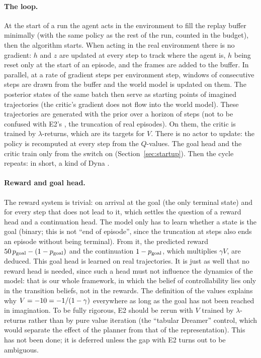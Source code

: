 \documentclass[10pt]{article}
\begin{document}
\paragraph{The loop.}
At the start of a run the agent acts in the environment to fill the replay buffer minimally (with the same policy as the
rest of the run, counted in the budget), then the algorithm starts.
When acting in the real environment there is no gradient: $h$ and $z$ are updated at every step to track where the
agent is, $h$ being reset only at the start of an episode, and the frames are added to the buffer.
In parallel, at a rate of \eThreeReplayRatio{} gradient steps per environment step, \eThreeBatchWindows{} windows of
\eThreeWindowLength{} consecutive steps are drawn from the buffer and the world model is updated on them.
The posterior states of the same batch then serve as starting points of imagined trajectories (the critic's gradient
does not flow into the world model).
These trajectories are generated with the prior over a horizon of \eThreeImagHorizon{} steps (not to be confused with
E2's \eThreeEpisodeHorizon, the truncation of real episodes).
On them, the critic is trained by $\lambda$-returns, which are its targets for $V$.
There is no actor to update: the policy is recomputed at every step from the $Q$-values.
The goal head and the critic train only from the switch on (Section~\ref{sec:startup}).
Then the cycle repeats: in short, a kind of Dyna .

\paragraph{Reward and goal head.}
The reward system is trivial: \eThreeGoalReward{} on arrival at the goal (the only terminal state) and
\eThreeStepReward{} for every step that does not lead to it, which settles the question of a reward head and a
continuation head.
The model only has to learn whether a state is the goal (binary; this is not ``end of episode'', since the truncation at
\eThreeEpisodeHorizon{} steps also ends an episode without being terminal).
From it, the predicted reward $50\,p_{\mathrm{goal}} - (1 - p_{\mathrm{goal}})$ and the continuation $1 - p_{\mathrm{goal}}$, which multiplies %
$\gamma V$, are deduced.
This goal head is learned on real trajectories.
It is just as well that no reward head is needed, since such a head must not influence the dynamics of the model: that
is our whole framework, in which the belief of controllability lies only in the transition beliefs, not in the rewards.
The definition of the values explains why $V = -10 = -1/(1 - \gamma)$ everywhere as long as %
the goal has not been reached in imagination.
To be fully rigorous, E2 should be rerun with $V$ trained by $\lambda$-returns rather than by pure value iteration (the
``tabular Dreamer'' control, which would separate the effect of the planner from that of the representation).
This has not been done; it is deferred unless the gap with E2 turns out to be ambiguous.
\end{document}
